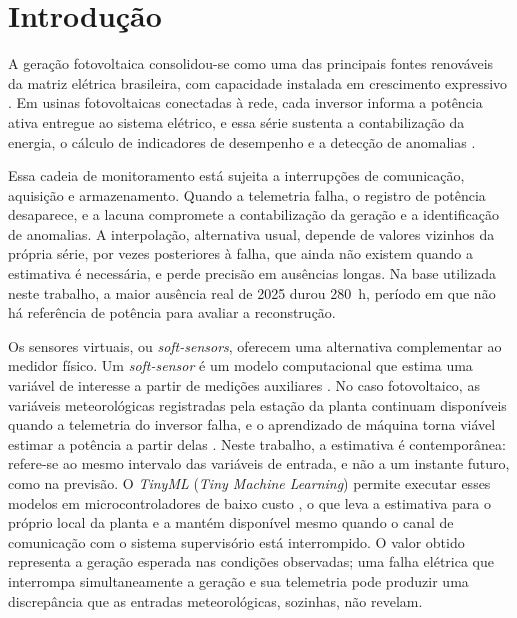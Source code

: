 \chapter{Introdução}
\label{cap:introducao}

A geração fotovoltaica consolidou-se como uma das principais fontes renováveis
da matriz elétrica brasileira, com capacidade instalada em crescimento expressivo
\cite{epe2026}. Em usinas fotovoltaicas conectadas à rede, cada inversor informa
a potência ativa entregue ao sistema elétrico, e essa série sustenta a
contabilização da energia, o cálculo de indicadores de desempenho e a detecção de
anomalias \cite{lindig2020monitoramento,livera2020qualidade}.

Essa cadeia de monitoramento está sujeita a interrupções de comunicação, aquisição
e armazenamento. Quando a telemetria falha, o registro de potência desaparece, e a
lacuna compromete a contabilização da geração e a identificação de anomalias. A
interpolação, alternativa usual, depende de valores vizinhos da própria série, por
vezes posteriores à falha, que ainda não existem quando a estimativa é necessária,
e perde precisão em ausências longas. Na base utilizada neste trabalho, a maior
ausência real de 2025 durou 280~h, período em que não há referência de potência
para avaliar a reconstrução.

Os sensores virtuais, ou \textit{soft-sensors}, oferecem uma alternativa
complementar ao medidor físico. Um \textit{soft-sensor} é um modelo computacional
que estima uma variável de interesse a partir de medições auxiliares
\cite{kadlec2009}. No caso fotovoltaico, as variáveis meteorológicas registradas
pela estação da planta continuam disponíveis quando a telemetria do inversor falha,
e o aprendizado de máquina torna viável estimar a potência a partir delas
\cite{gupta2021}. Neste trabalho, a estimativa é contemporânea: refere-se ao mesmo
intervalo das variáveis de entrada, e não a um instante futuro, como na previsão.
O \textit{TinyML} (\textit{Tiny Machine Learning}) permite executar esses modelos em
microcontroladores de baixo custo \cite{david2021}, o que leva a estimativa para o
próprio local da planta e a mantém disponível mesmo quando o canal de comunicação
com o sistema supervisório está interrompido. O valor obtido representa a geração
esperada nas condições observadas; uma falha elétrica que interrompa simultaneamente
a geração e sua telemetria pode produzir uma discrepância que as entradas
meteorológicas, sozinhas, não revelam.

